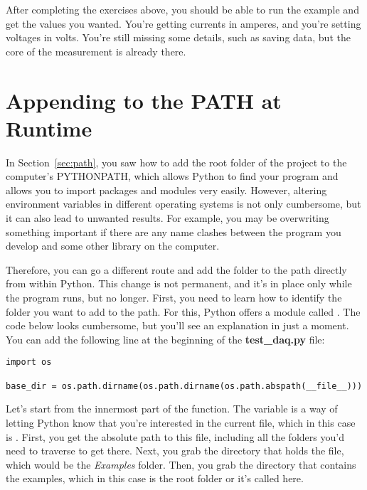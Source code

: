 
After completing the exercises above, you should be able to run the example and get the values you wanted. You're getting currents in amperes, and you're setting voltages in volts. You're still missing some details, such as saving data, but the core of the measurement is already there.

\section{Appending to the PATH at Runtime}\label{sec:appending-path}
In Section~\ref{sec:path}, you saw how to add the root folder of the project to the computer's PYTHONPATH, which allows Python to find your program and allows you to import packages and modules very easily. However, altering environment variables in different operating systems is not only cumbersome, but it can also lead to unwanted results. For example, you may be overwriting something important if there are any name clashes between the program you develop and some other library on the computer.

Therefore, you can go a different route and add the folder to the path directly from within Python. This change is not permanent, and it's in place only while the program runs, but no longer. First, you need to learn how to identify the folder you want to add to the path. For this, Python offers a module called . The code below looks cumbersome, but you'll see an explanation in just a moment. You can add the following line at the beginning of the \textbf{test\_daq.py} file:

\begin{verbatim}
import os

base_dir = os.path.dirname(os.path.dirname(os.path.abspath(__file__)))
\end{verbatim}

Let's start from the innermost part of the function. The  variable is a way of letting Python know that you're interested in the current file, which in this case is . First, you get the absolute path to this file, including all the folders you'd need to traverse to get there. Next, you grab the directory that holds the file, which would be the \emph{Examples} folder. Then, you grab the directory that contains the examples, which in this case is the root folder or  it's called here.

